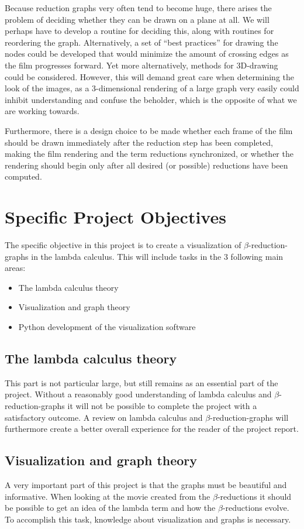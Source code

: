 \documentclass[11pt,oneside,a4paper]{article}
\begin{document}
Because reduction graphs very often tend to become huge, there arises the
problem of deciding whether they can be drawn on a plane at all. We will
perhaps have to develop a routine for deciding this, along with routines for
reordering the graph. Alternatively, a set of ``best practices'' for drawing
the nodes could be developed that would minimize the amount of crossing edges
as the film progresses forward. Yet more alternatively, methods for 3D-drawing
could be considered. However, this will demand great care when determining the
look of the images, as a 3-dimensional rendering of a large graph very easily
could inhibit understanding and confuse the beholder, which is the opposite of
what we are working towards.

Furthermore, there is a design choice to be made whether each frame of the
film should be drawn immediately after the reduction step has been completed,
making the film rendering and the term reductions synchronized, or whether the
rendering should begin only after all desired (or possible) reductions have
been computed.

\section{Specific Project Objectives}
The specific objective in this project is to create a visualization of $\beta$-reduction-graphs in the lambda calculus. This will include tasks in the 3 following main areas:
\begin{itemize}
	\item The lambda calculus theory
	\item Visualization and graph theory
	\item Python development of the visualization software
\end{itemize}

\subsection{The lambda calculus theory}
This part is not particular large, but still remains as an essential part of the project. Without a reasonably good understanding of lambda calculus and $\beta$-reduction-graphs it will not be possible to complete the project with a satisfactory outcome. A review on lambda calculus and $\beta$-reduction-graphs will furthermore create a better overall experience for the reader of the project report.

\subsection{Visualization and graph theory}
A very important part of this project is that the graphs must be beautiful and informative. When looking at the movie created from the $\beta$-reductions it should be possible to get an idea of the lambda term and how the $\beta$-reductions evolve. To accomplish this task, knowledge about visualization and graphs is necessary.
\end{document}
